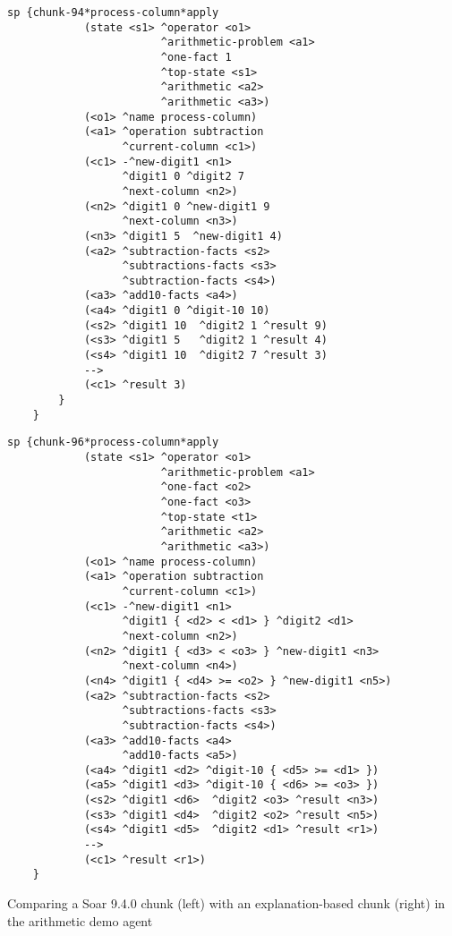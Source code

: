 \begin{center}
	\captionsetup{type=figure}
	\begin{multicols}{2}
	\begin{Verbatim}[fontsize=\tiny]
		sp {chunk-94*process-column*apply
		    (state <s1> ^operator <o1>
		                ^arithmetic-problem <a1>
		                ^one-fact 1
		                ^top-state <s1>
		                ^arithmetic <a2>
		                ^arithmetic <a3>)
		    (<o1> ^name process-column)
		    (<a1> ^operation subtraction
		          ^current-column <c1>)
		    (<c1> -^new-digit1 <n1>
		          ^digit1 0 ^digit2 7
		          ^next-column <n2>)
		    (<n2> ^digit1 0 ^new-digit1 9
		          ^next-column <n3>)
		    (<n3> ^digit1 5  ^new-digit1 4)
		    (<a2> ^subtraction-facts <s2>
		          ^subtractions-facts <s3>
		          ^subtraction-facts <s4>)
		    (<a3> ^add10-facts <a4>)
		    (<a4> ^digit1 0 ^digit-10 10)
		    (<s2> ^digit1 10  ^digit2 1 ^result 9)
		    (<s3> ^digit1 5   ^digit2 1 ^result 4)
		    (<s4> ^digit1 10  ^digit2 7 ^result 3)
		    -->
		    (<c1> ^result 3)
		}
	}
	\end{Verbatim}
	\columnbreak
	\begin{Verbatim}[fontsize=\tiny]
		sp {chunk-96*process-column*apply
		    (state <s1> ^operator <o1>
		                ^arithmetic-problem <a1>
		                ^one-fact <o2>
		                ^one-fact <o3>
		                ^top-state <t1>
		                ^arithmetic <a2>
		                ^arithmetic <a3>)
		    (<o1> ^name process-column)
		    (<a1> ^operation subtraction
		          ^current-column <c1>)
		    (<c1> -^new-digit1 <n1>
		          ^digit1 { <d2> < <d1> } ^digit2 <d1>
		          ^next-column <n2>)
		    (<n2> ^digit1 { <d3> < <o3> } ^new-digit1 <n3>
		          ^next-column <n4>)
		    (<n4> ^digit1 { <d4> >= <o2> } ^new-digit1 <n5>)
		    (<a2> ^subtraction-facts <s2>
		          ^subtractions-facts <s3>
		          ^subtraction-facts <s4>)
		    (<a3> ^add10-facts <a4>
			      ^add10-facts <a5>)
		    (<a4> ^digit1 <d2> ^digit-10 { <d5> >= <d1> })
		    (<a5> ^digit1 <d3> ^digit-10 { <d6> >= <o3> })
		    (<s2> ^digit1 <d6>  ^digit2 <o3> ^result <n3>)
		    (<s3> ^digit1 <d4>  ^digit2 <o2> ^result <n5>)
		    (<s4> ^digit1 <d5>  ^digit2 <d1> ^result <r1>)
		    -->
		    (<c1> ^result <r1>)
	}
	\end{Verbatim}
\end{multicols}
	\caption{Comparing a Soar 9.4.0 chunk (left) with an explanation-based chunk (right) in the arithmetic demo agent}
	\label{fig:chunk-comparison}
\end{center}
